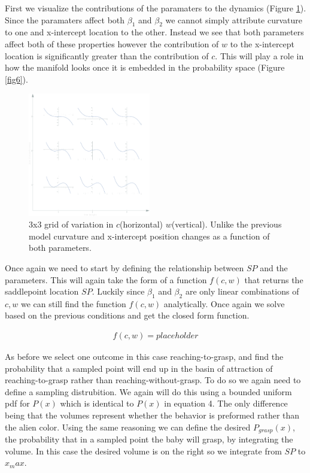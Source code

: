 \documentclass[letterpaper]{article}
\begin{document}
First we visualize the contributions of the paramaters to the dynamics (Figure \ref{fig5}).
Since the paramaters affect both $\beta_1$ and $\beta_2$ we cannot simply attribute 
curvature to one and x-intercept location to the other. Instead we see that both parameters
affect both of these properties however the contribution of $w$ to the x-intercept location
is significantly greater than the contribution of $c$. This will play a role in how the
manifold looks once it is embedded in the probability space (Figure \ref{fig6}).

\begin{figure}[t]
\begin{center}
\includegraphics[width=2.1in,angle=0]{./prehension_params.png}
\caption{3x3 grid of variation in $c$(horizontal) $w$(vertical). Unlike the previous
model curvature and x-intercept position changes as a function of both parameters.}
\label{fig5}
\end{center}
\end{figure}

Once again we need to start by defining the relationship between $SP$ and the parameters.
This will again take the form of a function $f(c,w)$ that returns the saddlepoint location 
$SP$.
Luckily since $\beta_1$ and $\beta_2$ are only linear combinations of $c,w$ we can still
find the function $f(c,w)$ analytically. Once again we solve based on the previous conditions
and get the closed form function.

\begin{eqnarray}
  f(c,w) = placeholder
\end{eqnarray}

As before we select one outcome in this case reaching-to-grasp,
and find the probability that a sampled point will end up in the basin of
attraction of reaching-to-grasp rather than reaching-without-grasp. To do so we again
need to define a sampling distrubition. We again will do this using a bounded uniform
pdf for $P(x)$ which is identical to $P(x)$ in equation 4. The only difference being 
that the volumes represent whether the behavior is preformed rather than the alien
color. Using the same reasoning we can define the desired $P_{grasp}(x)$, the probability
that in a sampled point the baby will grasp, by integrating the volume. In this case
the desired volume is on the right so we integrate from $SP$ to $x_max$.
\end{document}
